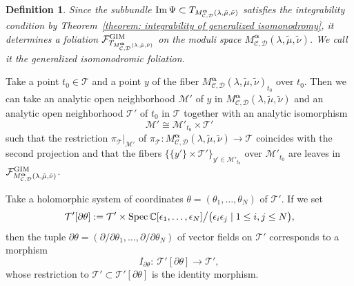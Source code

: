 \documentclass[pdftex]{sigma}
\numberwithin{equation}{section}
\newtheorem{Definition}[Theorem]{Definition}
\newcommand\im{\mathop{\rm Im}\nolimits}
\newcommand\Spec{\mathop{\rm Spec}\nolimits}
\newcommand{\balpha}{\boldsymbol \alpha}
\begin{document}
\begin{Definition}\label{definition: generalized isomonodromic foliation}
Since the subbundle
$\im\Psi\subset T_{M^{\balpha}_{{\mathcal C},{\mathcal D}}(\lambda,\tilde{\mu},\tilde{\nu})}$
satisfies the integrability condition by Theorem~\ref{theorem: integrability of generalized isomonodromy},
it determines a foliation
${\mathcal F}^{\rm GIM}_{T_{M^{\balpha}_{{\mathcal C},{\mathcal D}}(\lambda,\tilde{\mu},\tilde{\nu})}}$
on the moduli space
$M^{\balpha}_{{\mathcal C},{\mathcal D}}(\lambda,\tilde{\mu},\tilde{\nu})$.
We call it the generalized isomonodromic foliation.
\end{Definition}

Take a point $t_0\in {\mathcal T}$
and a point $y$ of the fiber
$M^{\balpha}_{{\mathcal C},{\mathcal D}}(\lambda,\tilde{\mu},\tilde{\nu})_{t_0}$
over $t_0$.
Then we can take an analytic open neighborhood
${\mathcal M'}$ of $y$ in
$M^{\balpha}_{{\mathcal C},{\mathcal D}}(\lambda,\tilde{\mu},\tilde{\nu})$
and an analytic open neighborhood ${\mathcal T'}$ of $t_0$ in ${\mathcal T}$
together with an analytic isomorphism
\begin{equation}
\label{equation: analytic isomorphism from isomonodromic foliation}
 {\mathcal M'}\cong {\mathcal M}'_{t_0}\times{\mathcal T'}
\end{equation}
such that the restriction $\pi_{\mathcal T}|_{\mathcal M'}$ of
$\pi_{\mathcal T} \colon M^{\balpha}_{{\mathcal C},{\mathcal D}}(\lambda,\tilde{\mu},\tilde{\nu})
\longrightarrow {\mathcal T}$
coincides with the second projection
and that the fibers $\{ \{ y' \} \times {\mathcal T'} \}_{y'\in {\mathcal M'_{t_0}}}$
over ${\mathcal M'_{t_0}}$ are leaves in
${\mathcal F}^{\rm GIM}_{M^{\balpha}_{{\mathcal C},{\mathcal D}}(\lambda,\tilde{\mu},\tilde{\nu})}$.

Take a holomorphic system of coordinates
$\theta=(\theta_1,\dots,\theta_N)$ of ${\mathcal T'}$.
If we set
\[
 {\mathcal T'}[\partial\theta]:=
 {\mathcal T'}\times\Spec\mathbb{C}[\epsilon_1,\dots,\epsilon_N]
 \big/ \big( \epsilon_i\epsilon_j \mid 1\leq i,j \leq N \big),
\]
then the tuple
$\partial\theta=
(\partial/\partial\theta_1,\dots,\partial/\partial\theta_N)$
of vector fields on ${\mathcal T'}$
corresponds to a morphism
\[
 I_{\partial\theta}\colon \
 {\mathcal T'}[\partial\theta]
 \longrightarrow {\mathcal T'},
\]
whose restriction to ${\mathcal T'}\subset {\mathcal T'}[\partial \theta]$ is the identity morphism.
\end{document}
